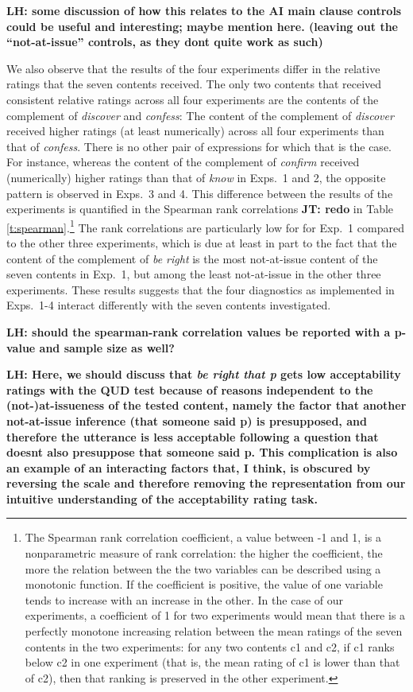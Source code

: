 \documentclass[times,linguex,xcolor]{glossa}
\newcommand{\lh}[1]{\textbf{\color{Cerulean}LH: #1}}
\begin{document}
  \lh{some discussion of how this relates to the AI main clause controls could be useful and interesting; maybe mention here. (leaving out the \enquote{not-at-issue} controls, as they dont quite work as such)}

  We also observe that the results of the four experiments differ in the relative ratings that the seven contents received. The only two contents that received consistent relative ratings across all four experiments are the contents of the complement of \emph{discover} and \emph{confess}: The content of the complement of \emph{discover} received higher ratings (at least numerically) across all four experiments than that of \emph{confess}. There is no other pair of expressions for which that is the case. For instance, whereas the content of the complement of \emph{confirm} received (numerically) higher ratings than that of \emph{know} in Exps.~1 and 2, the opposite pattern is observed in Exps.~3 and 4. This difference between the results of the experiments is quantified in the Spearman rank correlations  {\bf JT: redo} in Table \ref{t:spearman}.\footnote{The Spearman rank correlation coefficient, a value between -1 and 1, is a nonparametric measure of rank correlation: the higher the coefficient, the more the relation between the the two variables can be described using a monotonic function. If the coefficient is positive, the value of one variable tends to increase with an increase in the other. In the case of our experiments, a coefficient of 1 for two experiments would mean that there is a perfectly monotone increasing relation between the mean ratings of the seven contents in the two experiments: for any two contents c1 and c2, if c1 ranks below c2 in one experiment (that is, the mean rating of c1 is lower than that of c2), then that ranking is preserved in the other experiment.} The rank correlations are particularly low for for Exp.~1 compared to the other three experiments, which is due at least in part to the fact that the content of the complement of \emph{be right} is the most not-at-issue content of the seven contents in Exp.~1, but among the least not-at-issue in the other three experiments. These results suggests that the four diagnostics as implemented in Exps.~1-4 interact differently with the seven contents investigated.

  \lh{should the spearman-rank correlation values be reported with a p-value and sample size as well?}

  \lh{Here, we should discuss that \emph{be right that p} gets low acceptability ratings with the QUD test because of reasons independent to the (not-)at-issueness of the tested content, namely the factor that another not-at-issue inference (that someone said p) is presupposed, and therefore the utterance is less acceptable following a question that doesnt also presuppose that someone said p. This complication is also an example of an interacting factors that, I think, is obscured by reversing the scale and therefore removing the representation from our intuitive understanding of the acceptability rating task.}
\end{document}
